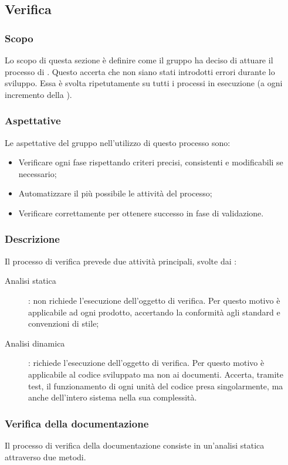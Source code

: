 \subsection{Verifica}
\subsubsection{Scopo}
Lo scopo di questa sezione è definire come il gruppo ha deciso di attuare il processo di . Questo accerta che non siano stati introdotti errori durante lo sviluppo. Essa è svolta ripetutamente su tutti i processi in esecuzione (a ogni incremento della ).

\subsubsection{Aspettative}
Le aspettative del gruppo \Gruppo{} nell'utilizzo di questo processo sono:
\begin{itemize}
	\item Verificare ogni fase rispettando criteri precisi, consistenti e modificabili se necessario;
	\item Automatizzare il più possibile le attività del processo;
	\item Verificare correttamente per ottenere successo in fase di validazione.
\end{itemize}

\subsubsection{Descrizione}
Il processo di verifica prevede due attività principali, svolte dai  :
\begin{description}
	\item[Analisi statica] : non richiede l'esecuzione dell'oggetto di verifica. Per questo motivo è applicabile ad ogni prodotto, accertando la conformità agli standard e convenzioni di stile;
	\item[Analisi dinamica] : richiede l'esecuzione dell'oggetto di verifica. Per questo motivo è applicabile al codice sviluppato ma non ai documenti. Accerta, tramite test, il funzionamento di ogni unità del codice presa singolarmente, ma anche dell'intero sistema nella sua complessità.
\end{description}

\subsubsection{Verifica della documentazione}
Il processo di verifica della documentazione consiste in un'analisi statica attraverso due metodi. 

